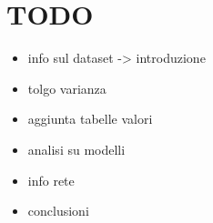 \chapter{TODO}
\begin{itemize}
	\item info sul dataset -> introduzione
	\item tolgo varianza
	\item aggiunta tabelle valori
	\item analisi su modelli
	\item info rete
	
	\item conclusioni
\end{itemize}